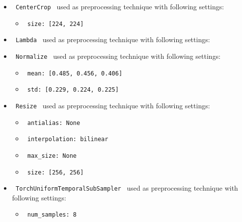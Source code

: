 \documentclass[11pt]{article}
\begin{document}
\begin{itemize}
    \item
     \verb| CenterCrop | used as preprocessing technique with following settings:
     \begin{itemize}
             \item
            \verb| size: [224, 224]|
           \end{itemize}
    \item
     \verb| Lambda | used as preprocessing technique with following settings:
     \begin{itemize}
           \end{itemize}
    \item
     \verb| Normalize | used as preprocessing technique with following settings:
     \begin{itemize}
             \item
            \verb| mean: [0.485, 0.456, 0.406]|
             \item
            \verb| std: [0.229, 0.224, 0.225]|
           \end{itemize}
    \item
     \verb| Resize | used as preprocessing technique with following settings:
     \begin{itemize}
             \item
            \verb| antialias: None|
             \item
            \verb| interpolation: bilinear|
             \item
            \verb| max_size: None|
             \item
            \verb| size: [256, 256]|
           \end{itemize}
    \item
     \verb| TorchUniformTemporalSubSampler | used as preprocessing technique with following settings:
     \begin{itemize}
             \item
            \verb| num_samples: 8|
           \end{itemize}
\end{itemize}
\hfill\break
\hfill\break
\end{document}
